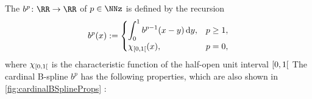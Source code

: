 %
%
%
The 
$b^p\colon \RR \to \RR$ of  $p \in \NNz$
is defined by the recursion
\begin{equation}
  \label{eq:cardinalBSpline}
  b^p(x)
  :=
  \begin{cases}
    \displaystyle\int_0^1 b^{p-1}(x - y) \mathop{}\!\mathrm{d}{}y,&p \ge 1,\\
    \chi_{\mathopen[0, 1\mathclose[}(x),&p = 0,
  \end{cases}
\end{equation}
where $\chi_{\mathopen[0, 1\mathclose[}$ is the characteristic function of
the half-open unit interval $\mathopen[0, 1\mathclose[$
\cite{Hoellig13Approximation}
The cardinal B-spline $b^p$ has the following properties,
which are also shown in \cref{fig:cardinalBSplineProps}
\cite{Hoellig03Finite}:
